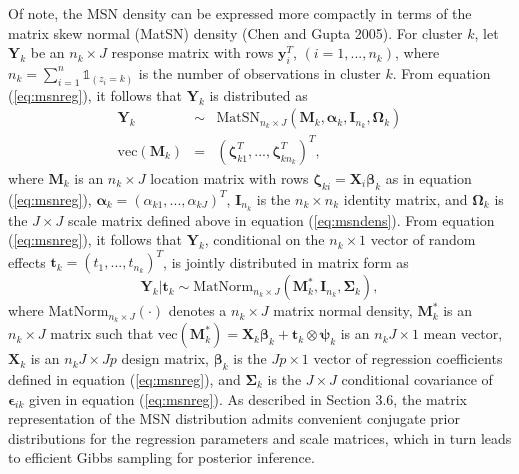 \documentclass[useAMS,referee]{biom}
\begin{document}
Of note, the MSN density can be expressed more compactly in terms of the matrix skew normal (MatSN) density (Chen and Gupta 2005). For cluster $k$, let $\mathbf{Y}_k$ be an ${n_k \times J}$ response matrix with rows $\mathbf{y}_i^T$, $(i = 1,...,n_k)$, where $n_k = \sum_{i = 1}^n \mathds{1}_{(z_i = k)}$ is the number of observations in cluster $k$. From equation (\ref{eq:msnreg}), it follows that $\mathbf{Y}_k$ is distributed as
\begin{eqnarray}
\mathbf{Y}_{k} &\sim& \text{MatSN}_{n_k \times J}(\mathbf{M}_k,\boldsymbol\alpha_k,\mathbf{I}_{n_k},\boldsymbol\Omega_k)\label{eq:matsn}\\
\text{vec}(\mathbf{M}_k) &=& (\boldsymbol\zeta_{k1}^T,...,\boldsymbol\zeta_{kn_k}^T)^T, \nonumber
\end{eqnarray}
where $\mathbf{M}_k$ is an $n_k \times J$ location matrix with rows $\boldsymbol\zeta_{ki} = \mathbf{X}_i \boldsymbol\beta_k$ as in equation (\ref{eq:msnreg}), $\boldsymbol\alpha_k = (\alpha_{k1},...,\alpha_{kJ})^T$, $\mathbf{I}_{n_k}$ is the $n_k\times n_k$ identity matrix, and $\boldsymbol\Omega_k$ is the $J\times J$ scale matrix defined above in equation (\ref{eq:msndens}). From equation (\ref{eq:msnreg}), it follows that $\mathbf{Y}_{k}$, conditional on the $n_k\times 1$ vector of random effects $\mathbf{t}_{k} = (t_1,...,t_{n_k})^T$, is jointly distributed in matrix form as
\begin{equation}
\label{eq:matnormal}
\mathbf{Y}_k | \mathbf{t}_k \sim \text{MatNorm}_{n_k \times J}(\mathbf{M}^*_k, \mathbf{I}_{n_k}, \boldsymbol\Sigma_k),
\end{equation}
where $\text{MatNorm}_{n_k \times J}(\cdot)$ denotes a $n_k\times J$ matrix normal density, $\mathbf{M}^*_k$ is an $n_k \times J$ matrix such that $\text{vec}(\mathbf{M}^*_k) = \mathbf{X}_{k} \boldsymbol\beta_k + \mathbf{t}_k \otimes \boldsymbol\psi_k$ is an $n_kJ\times 1$ mean vector, $\mathbf{X}_k$ is an $n_kJ \times Jp$ design matrix, $\boldsymbol\beta_k$ is the $Jp\times 1$ vector of regression coefficients defined in equation (\ref{eq:msnreg}), and $\boldsymbol\Sigma_k$ is the $J\times J$ conditional covariance of $\boldsymbol\epsilon_{ik}$ given in equation (\ref{eq:msnreg}). As described in Section 3.6, the matrix representation of the MSN distribution admits convenient conjugate prior distributions for the regression parameters and scale matrices, which in turn leads to efficient Gibbs sampling for posterior inference. 
\end{document}
